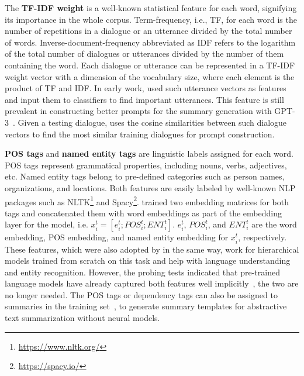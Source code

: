 The \textbf{TF-IDF weight} is a well-known statistical feature for each word, signifying its importance in the whole corpus. 
Term-frequency, i.e., TF,  for each word is the number of repetitions in a dialogue or an utterance divided by the total number of words. Inverse-document-frequency abbreviated as IDF refers to the logarithm of the total number of dialogues or utterances divided by the number of them containing the word.
Each dialogue or utterance can be represented in a TF-IDF weight vector with a dimension of the vocabulary size, where each element is the product of TF and IDF. 
In early work, \citet{murray2005extractive} used such utterance vectors as features and input them to classifiers to find important utterances.
This feature is still prevalent in constructing better prompts for the summary generation with GPT-3~\cite{brown2020language}. Given a testing dialogue, \citet{prodan2021prompt} uses the cosine similarities between such dialogue vectors to find the most similar training dialogues for prompt construction.


\textbf{POS tags} and \textbf{named entity tags} are linguistic labels assigned for each word. POS tags represent grammatical properties, including nouns, verbs, adjectives, etc. Named entity tags belong to pre-defined categories such as person names, organizations, and locations. Both features are easily labeled by well-known NLP packages such as NLTK\footnote{\url{https://www.nltk.org/}} and Spacy\footnote{\url{https://spacy.io/}}. 
\citet{zhu2020end} trained two embedding matrices for both tags and concatenated them with word embeddings as part of the embedding layer for the model, i.e.
$x_i^t = [e_i^t;POS_i^t;ENT_i^t]$. 
$e_i^t$, $POS_i^t$, and $ENT_i^t$ are the word embedding, POS embedding, and named entity embedding for $x_i^t$, respectively. These features, which were also adopted by \citet{qi2021improving} in the same way, work for hierarchical models trained from scratch on this task and 
help with language understanding and entity recognition. 
However, the probing tests indicated that pre-trained 
language models have already captured both features well 
implicitly~\cite{tenney2018you,miaschi2020linguistic}, the two are no longer 
needed. The POS tags or dependency tags can also be assigned to summaries in the training set~\cite{OyaMCN14,singla2017spoken}, to generate summary templates for abstractive text summarization without neural models. 

